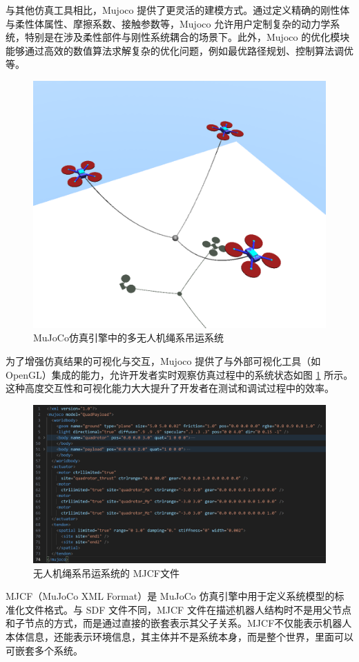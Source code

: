 \documentclass[lang=chs, degree=master, blindreview=true, winfonts=true]{yanputhesis}
\begin{document}
与其他仿真工具相比，Mujoco 提供了更灵活的建模方式。通过定义精确的刚性体与柔性体属性、摩擦系数、接触参数等，Mujoco 允许用户定制复杂的动力学系统，特别是在涉及柔性部件与刚性系统耦合的场景下。此外，Mujoco 的优化模块能够通过高效的数值算法求解复杂的优化问题，例如最优路径规划、控制算法调优等。

\begin{figure}[hbt!]
	\centering
	\includegraphics[width=34pc]{picture/5_3.png} 
	\caption{MuJoCo仿真引擎中的多无人机绳系吊运系统} 
	\label{5_3}
\end{figure}

为了增强仿真结果的可视化与交互，Mujoco 提供了与外部可视化工具（如 OpenGL）集成的能力，允许开发者实时观察仿真过程中的系统状态如图 \ref{5_3} 所示。这种高度交互性和可视化能力大大提升了开发者在测试和调试过程中的效率。

\begin{figure}[hbt!]
	\centering
	\includegraphics[width=36pc]{picture/MJCF.png} 
	\caption{无人机绳系吊运系统的 MJCF文件} 
	\label{MJCF}
\end{figure}
MJCF（MuJoCo XML Format）是 MuJoCo 仿真引擎中用于定义系统模型的标准化文件格式。与 SDF 文件不同，MJCF 文件在描述机器人结构时不是用父节点和子节点的方式，而是通过直接的嵌套表示其父子关系。MJCF不仅能表示机器人本体信息，还能表示环境信息，其主体并不是系统本身，而是整个世界，里面可以可嵌套多个系统。
\end{document}
